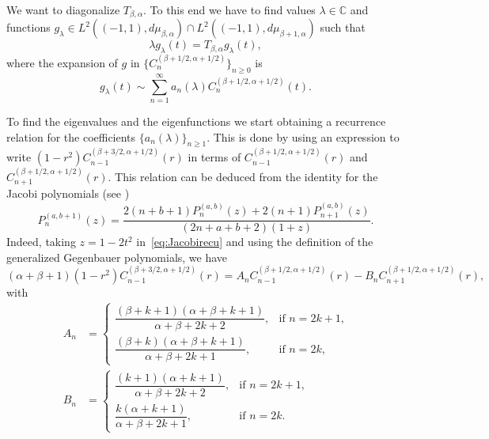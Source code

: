 \documentclass[12pt,a4paper]{amsart}
\theoremstyle{plain}
\theoremstyle{definition}
\newcommand{\C}{\mathbb{C}}
\begin{document}
We want to diagonalize $T_{\beta,\alpha}$. To this end we have to
find values $\lambda \in \C$ and functions $g_{\lambda} \in
L^2((-1,1), d\mu_{\beta,\alpha}) \cap L^2((-1,1),
d\mu_{\beta+1,\alpha})$ such that
\begin{equation}
\label{eq:problem-auto}
  \lambda g_\lambda(t) = T_{\beta,\alpha} g_\lambda(t),
\end{equation}
where the expansion of $g$ in
$\{C_n^{(\beta+1/2,\alpha+1/2)}\}_{n\ge 0}$ is
\begin{equation}
\label{eq:expaneigen}
  g_\lambda(t) \sim \sum_{n=1}^{\infty}
  a_n(\lambda) C_n^{(\beta+1/2,\alpha+1/2)}(t).
\end{equation}


To find the eigenvalues and the eigenfunctions we start obtaining
a recurrence relation for the coefficients $\{a_n(\lambda)\}_{n\ge 1}$.
This is done by using an expression to write
$(1-r^2)C_{n-1}^{(\beta+3/2,\alpha+1/2)}(r)$ in terms of
$C_{n-1}^{(\beta+1/2,\alpha+1/2)} (r)$ and
$C_{n+1}^{(\beta+1/2,\alpha+1/2)} (r)$. This relation can be
deduced from the identity for the Jacobi polynomials
(see \cite[formula 22.7.16, p.~782]{AbSt})
\begin{equation}
\label{eq:Jacobirecu}
  P_n^{(a,b+1)}(z) = \frac{2(n+b+1)P_n^{(a,b)}(z)
  + 2(n+1)P_{n+1}^{(a,b)}(z)}{(2n+a+b+2)(1+z)}.
\end{equation}
Indeed, taking $z=1-2t^2$ in~\eqref{eq:Jacobirecu} and using the
definition of the generalized Gegenbauer polynomials, we have
\begin{equation}
\label{eq:gegenrec}
  (\alpha+\beta+1) (1-r^2)
  C_{n-1}^{(\beta+3/2,\alpha+1/2)} (r) = A_n
  C_{n-1}^{(\beta+1/2,\alpha+1/2)} (r) - B_n
  C_{n+1}^{(\beta+1/2,\alpha+1/2)} (r),
\end{equation}
with
\begin{align*}
A_n &=
\begin{cases}
  \dfrac{(\beta+k+1)(\alpha+\beta+k+1)}{\alpha+\beta+2k+2}, & \text{if $n=2k+1$,} \\[6pt]
  \dfrac{(\beta+k)(\alpha+\beta+k+1)}{\alpha+\beta+2k+1}, & \text{if $n=2k$,}
\end{cases} \\
B_n &=
\begin{cases}
  \dfrac{(k+1)(\alpha+k+1)}{\alpha+\beta+2k+2}, & \text{if $n=2k+1$,} \\[6pt]
  \dfrac{k(\alpha+k+1)}{\alpha+\beta+2k+1}, & \text{if $n=2k$.}
\end{cases}
\end{align*}
\end{document}
